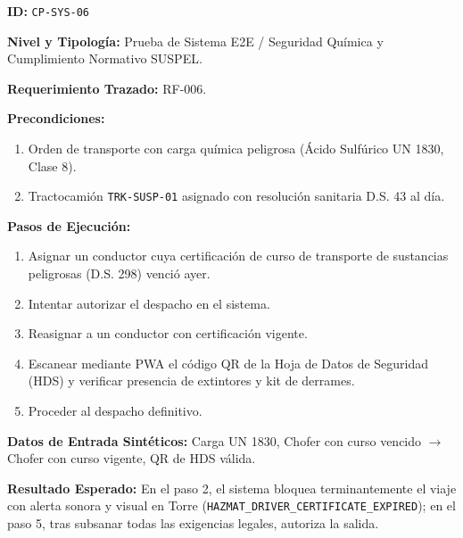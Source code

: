 \par\noindent\textbf{ID:} \texttt{C\allowbreak{}P\allowbreak{}-\allowbreak{}S\allowbreak{}Y\allowbreak{}S\allowbreak{}-\allowbreak{}0\allowbreak{}6\allowbreak{}}\par
\par\noindent\textbf{Nivel y Tipología:} Prueba de Sistema E2E / Seguridad Química y Cumplimiento Normativo SUSPEL.\par
\par\noindent\textbf{Requerimiento Trazado:} RF-006.\par
\par\noindent\textbf{Precondiciones:} \par
\begin{enumerate}
\item Orden de transporte con carga química peligrosa (Ácido Sulfúrico UN 1830, Clase 8).
\item Tractocamión \texttt{T\allowbreak{}R\allowbreak{}K\allowbreak{}-\allowbreak{}S\allowbreak{}U\allowbreak{}S\allowbreak{}P\allowbreak{}-\allowbreak{}0\allowbreak{}1\allowbreak{}} asignado con resolución sanitaria D.S. 43 al día.
\end{enumerate}
\par\noindent\textbf{Pasos de Ejecución:} \par
\begin{enumerate}
\item Asignar un conductor cuya certificación de curso de transporte de sustancias peligrosas (D.S. 298) venció ayer.
\item Intentar autorizar el despacho en el sistema.
\item Reasignar a un conductor con certificación vigente.
\item Escanear mediante PWA el código QR de la Hoja de Datos de Seguridad (HDS) y verificar presencia de extintores y kit de derrames.
\item Proceder al despacho definitivo.
\end{enumerate}
\par\noindent\textbf{Datos de Entrada Sintéticos:} Carga UN 1830, Chofer con curso vencido \(\rightarrow\) Chofer con curso vigente, QR de HDS válida.\par
\par\noindent\textbf{Resultado Esperado:} En el paso 2, el sistema bloquea terminantemente el viaje con alerta sonora y visual en Torre (\texttt{H\allowbreak{}A\allowbreak{}Z\allowbreak{}M\allowbreak{}A\allowbreak{}T\allowbreak{}\_\allowbreak{}D\allowbreak{}R\allowbreak{}I\allowbreak{}V\allowbreak{}E\allowbreak{}R\allowbreak{}\_\allowbreak{}C\allowbreak{}E\allowbreak{}R\allowbreak{}T\allowbreak{}I\allowbreak{}F\allowbreak{}I\allowbreak{}C\allowbreak{}A\allowbreak{}T\allowbreak{}E\allowbreak{}\_\allowbreak{}E\allowbreak{}X\allowbreak{}P\allowbreak{}I\allowbreak{}R\allowbreak{}E\allowbreak{}D\allowbreak{}}); en el paso 5, tras subsanar todas las exigencias legales, autoriza la salida.\par
